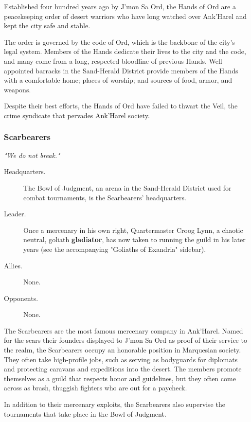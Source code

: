 \documentclass[letterpaper, 11pt, bg=full, twocolumn]{dndbook}
\begin{document}
Established four hundred years ago by J'mon Sa Ord, the Hands of Ord are a peacekeeping order of desert warriors who have long watched over Ank'Harel and kept the city safe and stable.

The order is governed by the code of Ord, which is the backbone of the city's legal system. Members of the Hands dedicate their lives to the city and the code, and many come from a long, respected bloodline of previous Hands. Well-appointed barracks in the Sand-Herald District provide members of the Hands with a comfortable home; places of worship; and sources of food, armor, and weapons.

Despite their best efforts, the Hands of Ord have failed to thwart the Veil, the crime syndicate that pervades Ank'Harel society.

\subsubsection{Scarbearers}

\textit{"We do not break."}

\begin{description}
\item[Headquarters.] The Bowl of Judgment, an arena in the Sand-Herald District used for combat tournaments, is the Scarbearers' headquarters.
\item[Leader.] Once a mercenary in his own right, Quartermaster Croog Lynn, a chaotic neutral, goliath \textbf{gladiator}, has now taken to running the guild in his later years (see the accompanying "Goliaths of Exandria" sidebar).
\item[Allies.] None.
\item[Opponents.] None.
\end{description}

The Scarbearers are the most famous mercenary company in Ank'Harel. Named for the scars their founders displayed to J'mon Sa Ord as proof of their service to the realm, the Scarbearers occupy an honorable position in Marquesian society. They often take high-profile jobs, such as serving as bodyguards for diplomats and protecting caravans and expeditions into the desert. The members promote themselves as a guild that respects honor and guidelines, but they often come across as brash, thuggish fighters who are out for a paycheck.

In addition to their mercenary exploits, the Scarbearers also supervise the tournaments that take place in the Bowl of Judgment.
\end{document}

